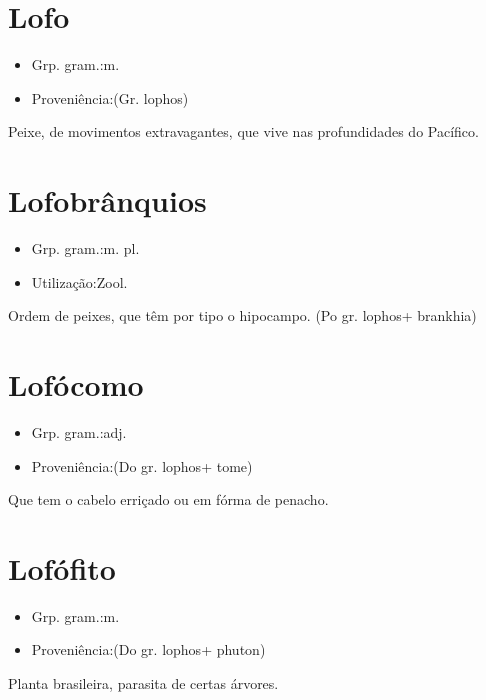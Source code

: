 \section{Lofo}
\begin{itemize}
\item {Grp. gram.:m.}
\end{itemize}
\begin{itemize}
\item {Proveniência:(Gr. \textunderscore lophos\textunderscore )}
\end{itemize}
Peixe, de movimentos extravagantes, que vive nas profundidades do Pacífico.
\section{Lofobrânquios}
\begin{itemize}
\item {Grp. gram.:m. pl.}
\end{itemize}
\begin{itemize}
\item {Utilização:Zool.}
\end{itemize}
Ordem de peixes, que têm por tipo o hipocampo.
(Po gr. \textunderscore lophos\textunderscore  + \textunderscore brankhia\textunderscore )
\section{Lofócomo}
\begin{itemize}
\item {Grp. gram.:adj.}
\end{itemize}
\begin{itemize}
\item {Proveniência:(Do gr. \textunderscore lophos\textunderscore  + \textunderscore tome\textunderscore )}
\end{itemize}
Que tem o cabelo erriçado ou em fórma de penacho.
\section{Lofófito}
\begin{itemize}
\item {Grp. gram.:m.}
\end{itemize}
\begin{itemize}
\item {Proveniência:(Do gr. \textunderscore lophos\textunderscore  + \textunderscore phuton\textunderscore )}
\end{itemize}
Planta brasileira, parasita de certas árvores.
